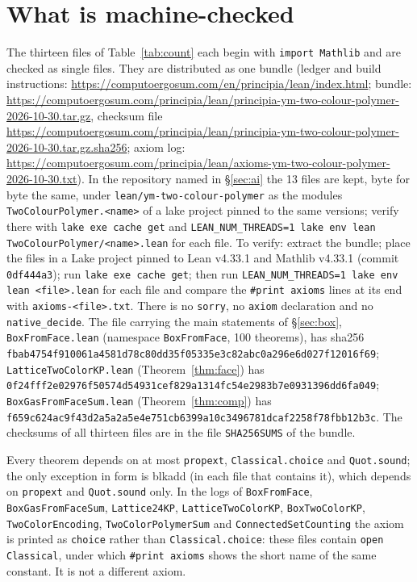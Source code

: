 \documentclass[11pt,a4paper]{article}
\theoremstyle{definition}
\theoremstyle{remark}
\DeclareRobustCommand{\lean}[1]{{\ttfamily\renewcommand{\_}{\textunderscore\allowbreak}#1}}
\begin{document}
\section{What is machine-checked}\label{sec:lean}

{\sloppy The thirteen files of Table~\ref{tab:count} each begin with \texttt{import Mathlib} and are checked as single files. They are distributed as one bundle (ledger and build instructions: \url{https://computoergosum.com/en/principia/lean/index.html}; bundle: \url{https://computoergosum.com/principia/lean/principia-ym-two-colour-polymer-2026-10-30.tar.gz}, checksum file \url{https://computoergosum.com/principia/lean/principia-ym-two-colour-polymer-2026-10-30.tar.gz.sha256}; axiom log: \url{https://computoergosum.com/principia/lean/axioms-ym-two-colour-polymer-2026-10-30.txt}). In the repository named in \S\ref{sec:ai} the 13 files are kept, byte for byte the same, under \texttt{lean/\allowbreak{}ym-two-colour-polymer} as the modules \texttt{TwoColourPolymer.<name>} of a lake project pinned to the same versions; verify there with \texttt{lake exe cache get} and \texttt{LEAN\_NUM\_THREADS=1 lake env lean TwoColourPolymer/\allowbreak{}<name>.lean} for each file. To verify: extract the bundle; place the files in a Lake project pinned to Lean v4.33.1 and Mathlib v4.33.1 (commit \texttt{0df444a3}); run \texttt{lake exe cache get}; then run \texttt{LEAN\_NUM\_THREADS=1 lake env lean <file>.lean} for each file and compare the \texttt{\#print axioms} lines at its end with \texttt{axioms-<file>.txt}. There is no \texttt{sorry}, no \texttt{axiom} declaration and no \texttt{native\_decide}. The file carrying the main statements of \S\ref{sec:box}, \texttt{BoxFromFace.lean} (namespace \texttt{BoxFromFace}, 100 theorems), has sha256 \texttt{fbab4754\allowbreak{}f910061a\allowbreak{}4581d78c\allowbreak{}80dd35f0\allowbreak{}5335e3c8\allowbreak{}2abc0a29\allowbreak{}6e6d027f\allowbreak{}12016f69}; \texttt{LatticeTwoColorKP.lean} (Theorem~\ref{thm:face}) has \texttt{0f24fff2\allowbreak{}e02976f5\allowbreak{}0574d549\allowbreak{}31cef829\allowbreak{}a1314fc5\allowbreak{}4e2983b7\allowbreak{}e0931396\allowbreak{}dd6fa049}; \texttt{BoxGasFromFaceSum.lean} (Theorem~\ref{thm:comp}) has \texttt{f659c624\allowbreak{}ac9f43d2\allowbreak{}a5a2a5e4\allowbreak{}e751cb63\allowbreak{}99a10c34\allowbreak{}96781dca\allowbreak{}f2258f78\allowbreak{}fbb12b3c}. The checksums of all thirteen files are in the file \texttt{SHA256SUMS} of the bundle.\par}

Every theorem depends on at most \texttt{propext}, \texttt{Classical.choice} and \texttt{Quot.sound}; the only exception in form is \lean{blk\_add} (in each file that contains it), which depends on \texttt{propext} and \texttt{Quot.sound} only. In the logs of \texttt{BoxFromFace}, \texttt{BoxGasFromFaceSum}, \texttt{Lattice24KP}, \texttt{LatticeTwoColorKP}, \texttt{BoxTwoColorKP}, \texttt{TwoColorEncoding}, \texttt{TwoColorPolymerSum} and \texttt{ConnectedSetCounting} the axiom is printed as \texttt{choice} rather than \texttt{Classical.choice}: these files contain \texttt{open Classical}, under which \texttt{\#print axioms} shows the short name of the same constant. It is not a different axiom.
\end{document}
